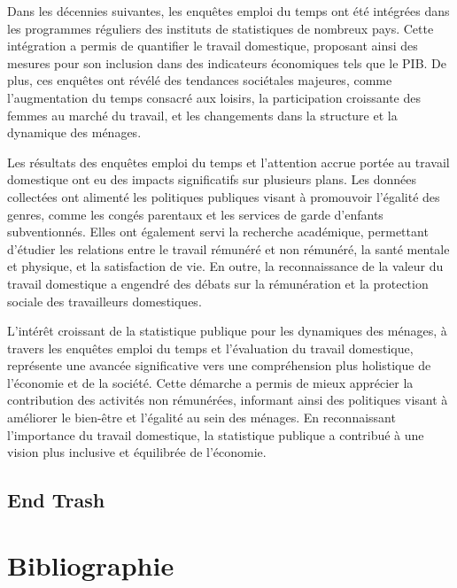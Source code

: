 \documentclass[
  12pt,
]{book}
\begin{document}
Dans les décennies suivantes, les enquêtes emploi du temps ont été
intégrées dans les programmes réguliers des instituts de statistiques de
nombreux pays. Cette intégration a permis de quantifier le travail
domestique, proposant ainsi des mesures pour son inclusion dans des
indicateurs économiques tels que le PIB. De plus, ces enquêtes ont
révélé des tendances sociétales majeures, comme l'augmentation du temps
consacré aux loisirs, la participation croissante des femmes au marché
du travail, et les changements dans la structure et la dynamique des
ménages.

Les résultats des enquêtes emploi du temps et l'attention accrue portée
au travail domestique ont eu des impacts significatifs sur plusieurs
plans. Les données collectées ont alimenté les politiques publiques
visant à promouvoir l'égalité des genres, comme les congés parentaux et
les services de garde d'enfants subventionnés. Elles ont également servi
la recherche académique, permettant d'étudier les relations entre le
travail rémunéré et non rémunéré, la santé mentale et physique, et la
satisfaction de vie. En outre, la reconnaissance de la valeur du travail
domestique a engendré des débats sur la rémunération et la protection
sociale des travailleurs domestiques.

L'intérêt croissant de la statistique publique pour les dynamiques des
ménages, à travers les enquêtes emploi du temps et l'évaluation du
travail domestique, représente une avancée significative vers une
compréhension plus holistique de l'économie et de la société. Cette
démarche a permis de mieux apprécier la contribution des activités non
rémunérées, informant ainsi des politiques visant à améliorer le
bien-être et l'égalité au sein des ménages. En reconnaissant
l'importance du travail domestique, la statistique publique a contribué
à une vision plus inclusive et équilibrée de l'économie.

\section{End Trash}\label{end-trash}

\listoftables

\listoffigures

\newpage

\chapter{Bibliographie}\label{bibliographie}
\end{document}
